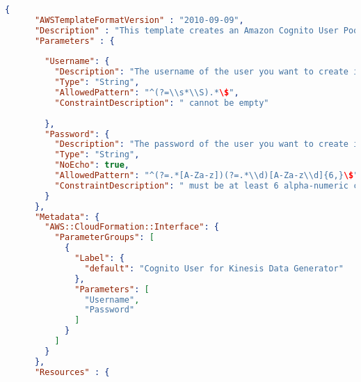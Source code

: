     \begin{lstlisting}[language=json,firstnumber=1]
    {
      "AWSTemplateFormatVersion" : "2010-09-09",
      "Description" : "This template creates an Amazon Cognito User Pool and Identity Pool, with a single user.  It assigns a role to authenticated users in the identity pool to enable the users to use the Kinesis Data Generator tool.",
      "Parameters" : {
    
        "Username": {
          "Description": "The username of the user you want to create in Amazon Cognito.",
          "Type": "String",
          "AllowedPattern": "^(?=\\s*\\S).*\$",
          "ConstraintDescription": " cannot be empty"
    
        },
        "Password": {
          "Description": "The password of the user you want to create in Amazon Cognito.",
          "Type": "String",
          "NoEcho": true,
          "AllowedPattern": "^(?=.*[A-Za-z])(?=.*\\d)[A-Za-z\\d]{6,}\$",
          "ConstraintDescription": " must be at least 6 alpha-numeric characters, and contain at least one number"
        }
      },
      "Metadata": {
        "AWS::CloudFormation::Interface": {
          "ParameterGroups": [
            {
              "Label": {
                "default": "Cognito User for Kinesis Data Generator"
              },
              "Parameters": [
                "Username",
                "Password"
              ]
            }
          ]
        }
      },
      "Resources" : {
    

\end{lstlisting}
